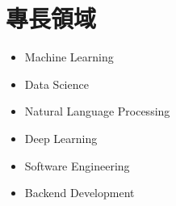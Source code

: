\section{專長領域}
\begin{flushleft}
    \begin{minipage}[t]{0.33\textwidth}
            \begin{itemize}
                \item Machine Learning
                \item Data Science
            \end{itemize}
    \end{minipage}%
    \begin{minipage}[t]{0.4\textwidth}
            \begin{itemize}
                \item Natural Language Processing
                \item Deep Learning
            \end{itemize}
    \end{minipage}%
    \begin{minipage}[t]{0.24\textwidth}
            \begin{itemize}
                \item Software Engineering
                \item Backend Development
            \end{itemize}
    \end{minipage}
\end{flushleft}